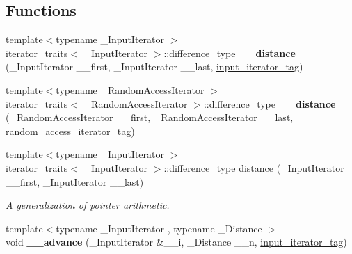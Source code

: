 \subsection*{Functions}
\begin{DoxyCompactItemize}
\item 
{\footnotesize template$<$typename \+\_\+\+Input\+Iterator $>$ }\\\hyperlink{structstd_1_1iterator__traits}{iterator\+\_\+traits}$<$ \+\_\+\+Input\+Iterator $>$\+::difference\+\_\+type {\bfseries \+\_\+\+\_\+distance} (\+\_\+\+Input\+Iterator \+\_\+\+\_\+first, \+\_\+\+Input\+Iterator \+\_\+\+\_\+last, \hyperlink{structstd_1_1input__iterator__tag}{input\+\_\+iterator\+\_\+tag})\hypertarget{namespacestd_ab81043897ffb393c4994974edc88049c}{}\label{namespacestd_ab81043897ffb393c4994974edc88049c}

\item 
{\footnotesize template$<$typename \+\_\+\+Random\+Access\+Iterator $>$ }\\\hyperlink{structstd_1_1iterator__traits}{iterator\+\_\+traits}$<$ \+\_\+\+Random\+Access\+Iterator $>$\+::difference\+\_\+type {\bfseries \+\_\+\+\_\+distance} (\+\_\+\+Random\+Access\+Iterator \+\_\+\+\_\+first, \+\_\+\+Random\+Access\+Iterator \+\_\+\+\_\+last, \hyperlink{structstd_1_1random__access__iterator__tag}{random\+\_\+access\+\_\+iterator\+\_\+tag})\hypertarget{namespacestd_ab187208141e420bcf7a10469f375d8a2}{}\label{namespacestd_ab187208141e420bcf7a10469f375d8a2}

\item 
{\footnotesize template$<$typename \+\_\+\+Input\+Iterator $>$ }\\\hyperlink{structstd_1_1iterator__traits}{iterator\+\_\+traits}$<$ \+\_\+\+Input\+Iterator $>$\+::difference\+\_\+type \hyperlink{namespacestd_a5852ded2c7147a161b33951ef37ecba8}{distance} (\+\_\+\+Input\+Iterator \+\_\+\+\_\+first, \+\_\+\+Input\+Iterator \+\_\+\+\_\+last)
\begin{DoxyCompactList}\small\item\em A generalization of pointer arithmetic. \end{DoxyCompactList}\item 
{\footnotesize template$<$typename \+\_\+\+Input\+Iterator , typename \+\_\+\+Distance $>$ }\\void {\bfseries \+\_\+\+\_\+advance} (\+\_\+\+Input\+Iterator \&\+\_\+\+\_\+i, \+\_\+\+Distance \+\_\+\+\_\+n, \hyperlink{structstd_1_1input__iterator__tag}{input\+\_\+iterator\+\_\+tag})\hypertarget{namespacestd_a481bd0e70ab965dc3e57a4c5cfc84f2a}{}\label{namespacestd_a481bd0e70ab965dc3e57a4c5cfc84f2a}


\end{DoxyCompactItemize}
